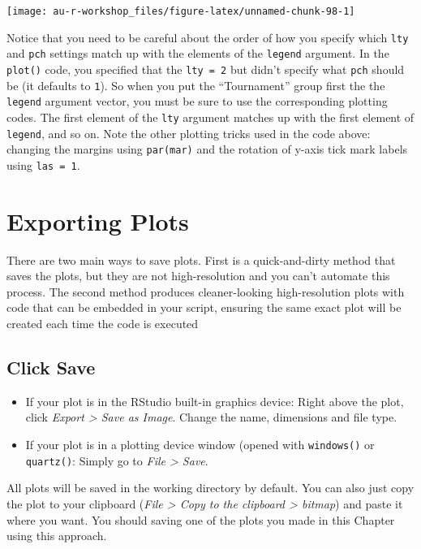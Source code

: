 \documentclass[]{book}
\providecommand{\tightlist}{%
  \setlength{\itemsep}{0pt}\setlength{\parskip}{0pt}}
\theoremstyle{definition}
\theoremstyle{definition}
\theoremstyle{definition}
\theoremstyle{remark}
\begin{document}
\begin{center}\texttt{[image: au-r-workshop\_files/figure-latex/unnamed-chunk-98-1]} \end{center}

Notice that you need to be careful about the order of how you specify
which \texttt{lty} and \texttt{pch} settings match up with the elements
of the \texttt{legend} argument. In the \texttt{plot()} code, you
specified that the \texttt{lty\ =\ 2} but didn't specify what
\texttt{pch} should be (it defaults to \texttt{1}). So when you put the
``Tournament'' group first the the \texttt{legend} argument vector, you
must be sure to use the corresponding plotting codes. The first element
of the \texttt{lty} argument matches up with the first element of
\texttt{legend}, and so on. Note the other plotting tricks used in the
code above: changing the margins using \texttt{par(mar)} and the
rotation of y-axis tick mark labels using \texttt{las\ =\ 1}.

\section{Exporting Plots}\label{exporting-plots}

There are two main ways to save plots. First is a quick-and-dirty method
that saves the plots, but they are not high-resolution and you can't
automate this process. The second method produces cleaner-looking
high-resolution plots with code that can be embedded in your script,
ensuring the same exact plot will be created each time the code is
executed

\subsection{Click Save}\label{click-save}

\begin{itemize}
\tightlist
\item
  If your plot is in the RStudio built-in graphics device: Right above
  the plot, click \emph{Export \textgreater{} Save as Image}. Change the
  name, dimensions and file type.
\item
  If your plot is in a plotting device window (opened with
  \texttt{windows()} or \texttt{quartz()}: Simply go to \emph{File
  \textgreater{} Save}.
\end{itemize}

All plots will be saved in the working directory by default. You can
also just copy the plot to your clipboard (\emph{File \textgreater{}
Copy to the clipboard \textgreater{} bitmap}) and paste it where you
want. You should saving one of the plots you made in this Chapter using
this approach.
\end{document}
